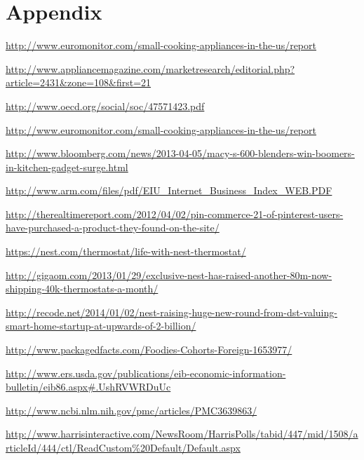 \documentclass[11pt]{article}
\theoremstyle{definition}
\begin{document}
\section{Appendix}

\begin{thebibliography}{}


\url{http://www.euromonitor.com/small-cooking-appliances-in-the-us/report}


\url{http://www.appliancemagazine.com/marketresearch/editorial.php?article=2431&zone=108&first=21}



 \url{http://www.oecd.org/social/soc/47571423.pdf}

\url{http://www.euromonitor.com/small-cooking-appliances-in-the-us/report}

\url{http://www.bloomberg.com/news/2013-04-05/macy-s-600-blenders-win-boomers-in-kitchen-gadget-surge.html}

\url{http://www.arm.com/files/pdf/EIU_Internet_Business_Index_WEB.PDF}

\url{http://therealtimereport.com/2012/04/02/pin-commerce-21-of-pinterest-users-have-purchased-a-product-they-found-on-the-site/}

\url{https://nest.com/thermostat/life-with-nest-thermostat/}

\url{http://gigaom.com/2013/01/29/exclusive-nest-has-raised-another-80m-now-shipping-40k-thermostats-a-month/}

\url{http://recode.net/2014/01/02/nest-raising-huge-new-round-from-dst-valuing-smart-home-startup-at-upwards-of-2-billion/}

\url{http://www.packagedfacts.com/Foodies-Cohorts-Foreign-1653977/}

\url{http://www.ers.usda.gov/publications/eib-economic-information-bulletin/eib86.aspx#.UshRVWRDuUc}

\url{http://www.ncbi.nlm.nih.gov/pmc/articles/PMC3639863/}

\url{http://www.harrisinteractive.com/NewsRoom/HarrisPolls/tabid/447/mid/1508/articleId/444/ctl/ReadCustom%20Default/Default.aspx}


\end{thebibliography}
\end{document}
